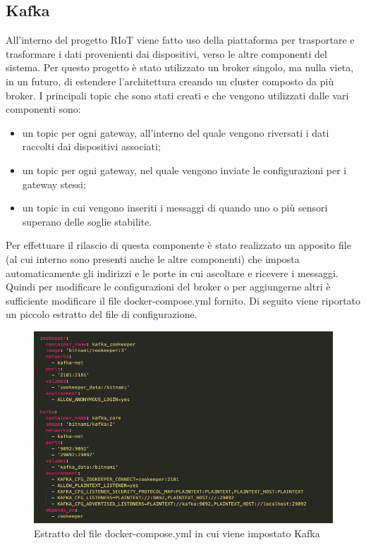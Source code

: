 \subsection{Kafka}
	All'interno del progetto RIoT viene fatto uso della piattaforma  per trasportare e trasformare i dati provenienti dai dispositivi, verso le altre componenti del sistema.
	\newline
	Per questo progetto è stato utilizzato un broker singolo, ma nulla vieta, in un futuro, di estendere l'architettura creando un cluster composto da più broker.
	\newline
	\newline
	I principali topic che sono stati creati e che vengono utilizzati dalle vari componenti sono:
	\begin{itemize}
		\item un topic per ogni gateway, all'interno del quale vengono riversati i dati raccolti dai dispositivi associati;
		\item un topic per ogni gateway, nel quale vengono inviate le configurazioni per i gateway stessi;
		\item un topic in cui vengono inseriti i messaggi di  quando uno o più sensori superano delle 
		soglie stabilite.
	\end{itemize}
	Per effettuare il rilascio di questa componente è stato realizzato un apposito file  (al cui interno sono presenti anche le altre componenti) che imposta automaticamente gli indirizzi e le porte in cui ascoltare e ricevere i messaggi. Quindi per modificare le configurazioni del broker  o per aggiungerne altri è sufficiente modificare il file docker-compose.yml fornito.
	\newline
	Di seguito viene riportato un piccolo estratto del file di configurazione.

		\begin{figure}[H]
			\centering
			\includegraphics[scale=0.470]{res/images/estrattoKafka_dockerCompose.png}
			\caption{Estratto del file docker-compose.yml in cui viene impostato Kafka}
			\label{Immagine 1}
		\end{figure}
	\pagebreak
